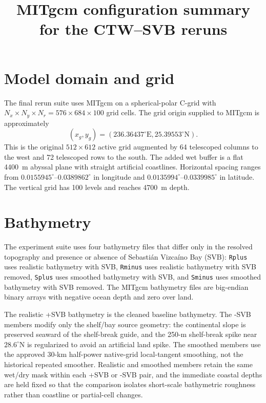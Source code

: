 \documentclass[11pt]{article}
\title{MITgcm configuration summary for the CTW--SVB reruns}
\author{}
\date{}
\begin{document}
\maketitle

\section*{Model domain and grid}
The final rerun suite uses MITgcm on a spherical-polar C-grid with
$N_x \times N_y \times N_r = 576 \times 684 \times 100$ grid cells.  The grid
origin supplied to MITgcm is approximately
\[
(x_g,y_g)=(236.36437^\circ\mathrm{E},25.39553^\circ\mathrm{N}).
\]
This is the original $512 \times 612$ active grid augmented by 64 telescoped
columns to the west and 72 telescoped rows to the south.  The added wet buffer
is a flat \SI{4400}{m} abyssal plane with straight artificial coastlines.
Horizontal spacing ranges from $0.0155945^\circ$--$0.0389862^\circ$ in
longitude and $0.0135994^\circ$--$0.0339985^\circ$ in latitude.  The vertical
grid has 100 levels and reaches \SI{4700}{m} depth.

\section*{Bathymetry}
The experiment suite uses four bathymetry files that differ only in the
resolved topography and presence or absence of Sebasti\'an Vizca\'ino Bay (SVB):
\texttt{Rplus} uses realistic bathymetry with SVB, \texttt{Rminus} uses
realistic bathymetry with SVB removed, \texttt{Splus} uses smoothed bathymetry
with SVB, and \texttt{Sminus} uses smoothed bathymetry with SVB removed.  The
MITgcm bathymetry files are big-endian binary arrays with negative ocean depth
and zero over land.

The realistic +SVB bathymetry is the cleaned baseline bathymetry.  The -SVB
members modify only the shelf/bay source geometry: the continental slope is
preserved seaward of the shelf-break guide, and the 250-m shelf-break spike near
$28.6^\circ$N is regularized to avoid an artificial land spike.  The smoothed
members use the approved 30-km half-power native-grid local-tangent smoothing,
not the historical repeated smoother.  Realistic and smoothed members retain the
same wet/dry mask within each +SVB or -SVB pair, and the immediate coastal
depths are held fixed so that the comparison isolates short-scale bathymetric
roughness rather than coastline or partial-cell changes.
\end{document}
